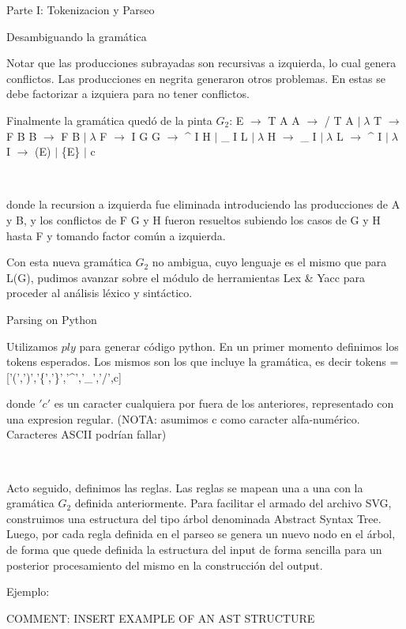 \begin{section}{Parte I: Tokenizacion y Parseo}
\begin{subsection}{Desambiguando la gram\'atica}
~

Notar que las producciones subrayadas son recursivas a izquierda, lo cual genera conflictos. 
Las producciones en negrita generaron otros problemas. En estas se debe factorizar a izquiera para no tener conflictos.

Finalmente la gram\'atica qued\'o de la pinta $G_{2}$:
\newline E $\rightarrow$ T A
\newline A $\rightarrow$ / T A $| \; \lambda$
\newline T $\rightarrow$ F B
\newline B $\rightarrow$ F B $| \; \lambda$
\newline F $\rightarrow$ I G
\newline G $\rightarrow$ \^{} I H $|$ \_ I L $| \; \lambda$
\newline H $\rightarrow$ \_ I $| \; \lambda$
\newline L $\rightarrow$ \^{} I $| \; \lambda$
\newline I $\rightarrow$ (E) $|$ \{E\} $|$ c
  
~

donde la recursion a izquierda fue eliminada introduciendo las producciones de A y B, y los conflictos de F G y H fueron resueltos subiendo los casos de G y H hasta F y tomando factor com\'un a izquierda.

Con esta nueva gram\'atica $G_{2}$ no ambigua, cuyo lenguaje es el mismo que para L(G), pudimos avanzar sobre el m\'odulo de herramientas Lex \& Yacc para proceder al an\'alisis l\'exico y sint\'actico.

\end{subsection}
\begin{subsection}{Parsing on Python}

Utilizamos $ply$ para generar c\'odigo python. En un primer momento definimos los tokens esperados. Los mismos son los que incluye la gram\'atica, es decir tokens = ['(',')','\{','\}','\^{}','\_','/',c]

donde $'c'$ es un caracter cualquiera por fuera de los anteriores, representado con una expresion regular. (NOTA: asumimos c como caracter alfa-num\'erico. Caracteres ASCII podr\'ian fallar)

~

Acto seguido, definimos las reglas. Las reglas se mapean una a una con la gram\'atica $G_2$ definida anteriormente. 
Para facilitar el armado del archivo SVG, construimos una estructura del tipo \'arbol denominada Abstract Syntax Tree. Luego, por cada regla definida en el parseo se genera un nuevo nodo en el \'arbol, de forma que quede definida la estructura del input de forma sencilla para un posterior procesamiento del mismo en la construcci\'on del output.

Ejemplo:

COMMENT: INSERT EXAMPLE OF AN AST STRUCTURE



\end{subsection}
\end{section}


